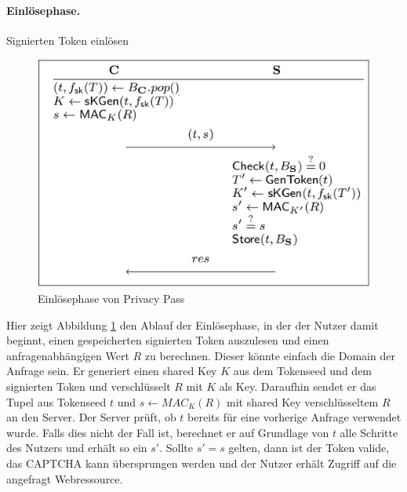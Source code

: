 \documentclass[
	fontsize=12pt,
	headings=small,
	parskip=half,           %
	bibliography=totoc,
	numbers=noenddot,       %
	open=any,               %
]{scrreprt}
\begin{document}
\paragraph{Einlösephase.} Signierten Token einlösen\\
\begin{figure}[H]
    \centering
    \includegraphics[width=0.5\linewidth]{pp-redemptionphase.png} 
    \caption{Einlösephase von Privacy Pass \cite{pp-davidson2018privacy}}
    \label{fig:pp-redemptoinphase}
\end{figure}
Hier zeigt Abbildung \ref{fig:pp-redemptoinphase} den Ablauf der Einlösephase, in der der Nutzer damit beginnt, einen gespeicherten signierten Token auszulesen und einen anfragenabhängigen Wert $R$ zu berechnen. Dieser könnte einfach die Domain der Anfrage sein. Er generiert einen shared Key $K$ aus dem Tokenseed und dem signierten Token und verschlüsselt $R$ mit $K$ als Key. Daraufhin sendet er das Tupel aus Tokenseed $t$ und $s\leftarrow MAC_{K}(R)$ mit shared Key verschlüsseltem $R$ an den Server. Der Server prüft, ob $t$ bereits für eine vorherige Anfrage verwendet wurde. Falls dies nicht der Fall ist, berechnet er auf Grundlage von $t$ alle Schritte des Nutzers und erhält so ein $s'$. Sollte $s'=s$ gelten, dann ist der Token valide, das CAPTCHA kann übersprungen werden und der Nutzer erhält Zugriff auf die angefragt Webressource.
\end{document}
